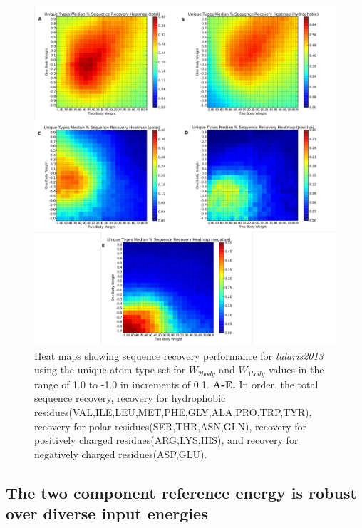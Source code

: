\begin{figure}[hbtp]
  \includegraphics[width=\linewidth]{Figures/unique_types_broad_gridsearch_classes.pdf}
  \caption{Heat maps showing sequence recovery performance for \textit{talaris2013} using the unique atom type set for $W_{2body}$ and $W_{1body}$ values in the range of 1.0 to -1.0 in increments of 0.1.
  \textbf{A-E.} In order, the total sequence recovery, recovery for hydrophobic residues(VAL,ILE,LEU,MET,PHE,GLY,ALA,PRO,TRP,TYR), recovery for polar residues(SER,THR,ASN,GLN), recovery for positively charged residues(ARG,LYS,HIS), and recovery for negatively charged residues(ASP,GLU).}
  \label{fig:gridsearch_classes}
\end{figure}

\subsection{The two component reference energy is robust over diverse input energies}
